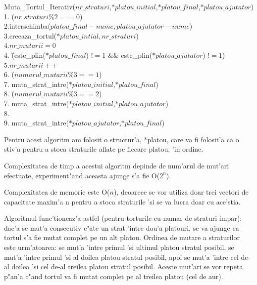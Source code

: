 \documentclass{article}
\begin{document}
\begin{center}
\begin{tabbing}

Muta\_Tortul\_Iterativ($nr\_straturi$,$*platou\_initial$,$*platou\_final$,$*platou\_ajutator$) \\
1. \=($nr\_straturi\%2==0$) \\
2.\indent           \>interschimba($platou\_final-nume,platou\_ajutator-nume$)\\
3.\indent creeaza\_tortul($*platou\_intial,nr\_straturi$)\\
4.\indent $nr\_mutarii = 0$\\
4. \=(este\_plin($*platou\_final$) $!= 1$ $\&\&$ este\_plin($*platou\_ajutator$)   $!=1$) \\
5.\indent               \>$nr\_mutarii++$ \\
6.\indent               {} \=($numarul\_mutarii \% 3 == 1$)\\
7.\indent               \>           \>muta\_strat\_intre($*platou\_initial$,$*platou\_final$)\\
8.\indent               {} \=($numarul\_mutarii \% 3 == 2$)\\
7.\indent               \>           \>muta\_strat\_intre($*platou\_initial$,$*platou\_ajutator$)\\
8.\indent               {}\\
9.\indent               \>           \>muta\_strat\_intre($*platou\_ajutator$,$*platou\_final$)\\


\end{tabbing}
\end{center}

Pentru acest algoritm am folosit o structur'a, *platou, care va fi folosit'a ca o stiv'a pentru a stoca straturile aflate pe fiecare platou, 'in ordine.

Complexitatea de timp a acestui algoritm depinde de num'arul de mut'ari efectuate, experiment"and aceasta ajunge s'a fie O($2^n$).

Complexitatea de memorie este O($n$), deoarece se vor utiliza doar trei vectori de capacitate maxim'a n pentru a stoca straturile 'si se va lucra doar cu ace'stia.


Algoritmul func'tioneaz'a astfel (pentru torturile cu numar de straturi impar): dac'a se mut'a consecutiv c"ate un strat 'intre dou'a platouri, se va ajunge ca tortul s'a fie mutat complet pe un alt platou. Ordinea de mutare a straturilor este urm'atoarea: se mut'a 'intre primul 'si ultimul platou stratul posibil, se mut'a 'intre primul 'si al doilea platou stratul posibil, apoi se mut'a 'intre cel de-al doilea 'si cel de-al treilea platou stratul posibil.
Aceste mut'ari se vor repeta p"an'a c"and tortul va fi mutat complet pe al treilea platou (cel de aur).
\end{document}
